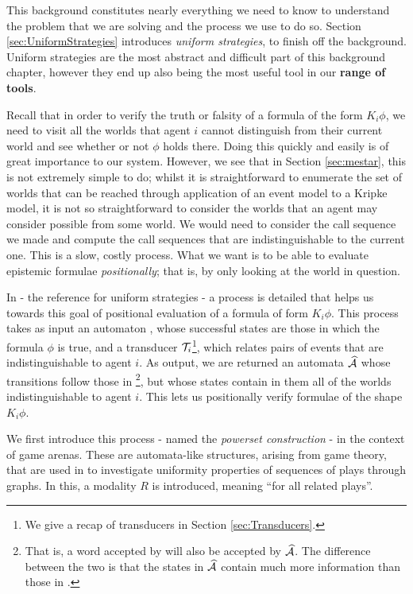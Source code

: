 \documentclass[10pt, a4paper]{report}
\begin{document}
This background constitutes nearly everything we need to know to understand the
problem that we are solving and the process we use to do so. Section
\ref{sec:UniformStrategies} introduces \emph{uniform strategies}, to finish off
the background. Uniform strategies are the most abstract and difficult part of
this background chapter, however they end up also being the most useful tool in
our \textbf{range of tools}.

Recall that in order to verify the truth or falsity of a formula of the form
$K_i \phi$, we need to visit all the worlds that agent $i$ cannot distinguish
from their current world and see whether or not $\phi$ holds there. Doing this
quickly and easily is of great importance to our system. However, we see that in
Section \ref{sec:mestar}, this is not extremely simple to do; whilst it is
straightforward to enumerate the set of worlds that can be reached through
application of an event model to a Kripke model, it is not so straightforward to
consider the worlds that an agent may consider possible from some world. We
would need to consider the call sequence we made and compute the call sequences
that are indistinguishable to the current one. This is a slow, costly process.
What we want is to be able to evaluate epistemic formulae \emph{positionally};
that is, by only looking at the world in question.

In \cite{UniformStrategies} - the reference for uniform strategies - a process
is detailed that helps us towards this goal of positional evaluation of a
formula of form $K_i \phi$. This process takes as input an automaton ,
whose successful states are those in which the formula $\phi$ is true, and a
transducer $\mathcal{T}_i$\footnote{We give a recap of transducers in Section
  \ref{sec:Transducers}.}, which relates pairs of events that are
indistinguishable to agent $i$. As output, we are returned an automata
$\widehat{\mathcal{A}}$ whose transitions follow those in \footnote{That is,
  a word accepted by  will also be accepted by $\widehat{\mathcal{A}}$. The
  difference between the two is that the states in $\widehat{\mathcal{A}}$ contain
  much more information than those in .}, but whose states
contain in them all of the worlds indistinguishable to agent $i$. This lets us
positionally verify formulae of the shape $K_i \phi$.

We first introduce this process - named the \emph{powerset construction} - in
the context of game arenas. These are automata-like structures, arising from
game theory, that are used in \cite{UniformStrategies} to investigate uniformity
properties of sequences of plays through graphs. In this, a modality $R$ is
introduced, meaning ``for all related plays''.
\end{document}
